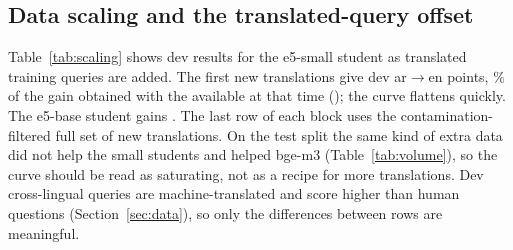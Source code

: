 \documentclass[11pt]{article}
\newcommand{\tabfont}{\footnotesize\setlength{\tabcolsep}{3.2pt}}
\newcommand{\ardir}{ar$\to$en}
\begin{document}
\subsection{Data scaling and the translated-query offset}
Table~\ref{tab:scaling} shows dev results for the e5-small student as translated training queries are added.
The first \NumScaleSmallFirstN{} new translations give \NumScaleSmallFirstGain{} dev \ardir{} points, \NumScaleSmallFirstShare\% of the gain obtained with the \NumScaleSmallFullN{} available at that time (\NumScaleSmallFullGain{}); the curve flattens quickly.
The e5-base student gains \NumScaleBaseFullGain{}. The last row of each block uses the contamination-filtered full set of \NumScaleFinalN{} new translations.
On the test split the same kind of extra data did not help the small students and helped bge-m3 (Table~\ref{tab:volume}), so the curve should be read as saturating, not as a recipe for more translations.
Dev cross-lingual queries are machine-translated and score higher than human questions (Section~\ref{sec:data}), so only the differences between rows are meaningful.

\begin{table}[t]
\centering\tabfont
{}
\caption{Data-scaling curve (DEV, no distillation); ``new transl.'' counts the new translated queries in each run's training set. Dev cross-lingual queries are machine-translated.}\label{tab:scaling}
\end{table}

\begin{table}[t]
\centering\tabfont
{}
\caption{Test MRR@10 $\times100$ with the translated queries available at the first runs (partial) versus the full v2 set.}\label{tab:volume}
\end{table}
\end{document}
